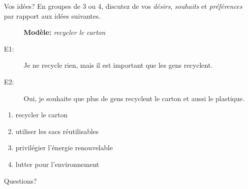 \documentclass{beamer}
\begin{document}
  \begin{frame}{Vos idées?}
    En groupes de 3 ou 4, discutez de vos \emph{désirs}, \emph{souhaits} et \emph{préférences} par rapport aux idées suivantes.
    \begin{description}
      \item[] \textbf{Modèle:} \emph{recycler le carton}
      \item[E1:] Je ne recycle rien, mais il est important que les gens recyclent.
      \item[E2:] Oui, je souhaite que plus de gens recyclent le carton et aussi le plastique.
    \end{description}
    \begin{enumerate}
      \item recycler le carton
      \item utiliser les sacs réutilisables
      \item privilégier l'énergie renouvelable
      \item lutter pour l'environnement
    \end{enumerate}
  \end{frame}

  \begin{frame}{}
    \begin{center}
      \Large Questions?
    \end{center}
  \end{frame}
\end{document}
